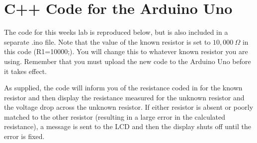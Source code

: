\documentclass[]{article}
\begin{document}
	\section{C++ Code for the Arduino Uno}

	The code for this weeks lab is reproduced below, but is also included in a separate .ino file.  Note that the value of the known resistor is set to $10,000\ \Omega$ in this code (R1=10000;).  You will change this to whatever known resistor you are using.  Remember that you must upload the new code to the Arduino Uno before it takes effect.

	As supplied, the code will inform you of the resistance coded in for the known resistor and then display the resistance measured for the unknown resistor and the voltage drop across the unknown resistor.  If either resistor is absent or poorly matched to the other resistor (resulting in a large error in the calculated resistance), a message is sent to the LCD and then the display shuts off until the error is fixed.  
\end{document}
